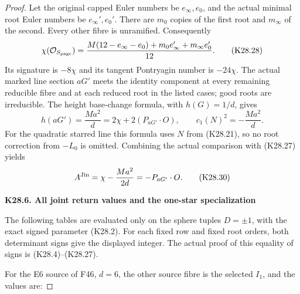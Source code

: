 \begin{proof}
Let the original capped Euler numbers be \(e_\infty,e_0\),
and the actual minimal root Euler numbers be
\(e_\infty',e_0'\). There are \(m_0\) copies of the first root
and \(m_\infty\) of the second. Every other fibre is unramified.
Consequently
\[
 \chi(\mathcal O_{S_{\rm page}})
   =\frac{M(12-e_\infty-e_0)
            +m_0e_\infty'+m_\infty e_0'}{12}.
 \tag{K28.28}
\]
Its signature is \(-8\chi\) and its tangent Pontryagin number is
\(-24\chi\). The actual marked line section \(aG'\) meets the
identity component at every remaining reducible fibre and at
each reduced root in the listed cases; good roots are irreducible.
The height base-change formula, with \(h(G)=1/d\), gives
\[
 h(aG')=\frac{Ma^2}{d}
       =2\chi+2(P_{aG'}\cdot O),\qquad
 c_1(N)^2=-\frac{Ma^2}{d}.
 \tag{K28.29}
\]
For the quadratic starred line this formula uses \(N\) from
(K28.21), so no root correction from \(-L_0\) is omitted.
Combining the actual comparison with (K28.27) yields
\[
                    A^{\rm Jin}
                         =\chi-\frac{Ma^2}{2d}
                         =-P_{aG'}\cdot O .
 \tag{K28.30}
\]

\par

\medskip\noindent\textbf{K28.6. All joint return values and the one-star specialization}

\par\nobreak

The following tables are evaluated only on the sphere tuples
\(D=\pm1\), with the exact signed parameter (K28.2). For each
fixed row and fixed root orders, both determinant signs give
the displayed integer. The actual proof of this equality of
signs is (K28.4)--(K28.27).

For the E6 source of F46, \(d=6\), the other source fibre is
the selected \(I_1\), and the values are:

\par{}\par\medskip


\end{proof}
